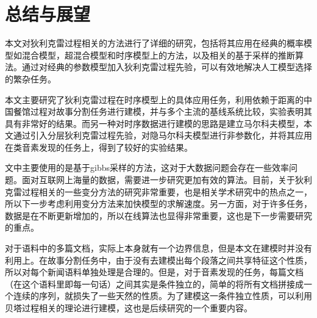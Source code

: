 \chapter{总结与展望}
本文对狄利克雷过程相关的方法进行了详细的研究，包括将其应用在经典的概率模型如混合模型，超混合模型和时序模型上的方法，以及相关的基于采样的推断算法。通过对经典的参数模型加入狄利克雷过程先验，可以有效地解决人工模型选择的繁杂任务。

本文主要研究了狄利克雷过程在时序模型上的具体应用任务，利用依赖于距离的中国餐馆过程对故事分割任务进行建模，并与多个主流的基线系统比较，实验表明其具有非常好的结果。而另一种对时序数据进行建模的思路是建立马尔科夫模型，本文通过引入分层狄利克雷过程先验，对隐马尔科夫模型进行非参数化，并将其应用在类音素发现的任务上，得到了较好的实验结果。

文中主要使用的是基于gibbs采样的方法，这对于大数据问题会存在一些效率问题。面对互联网上海量的数据，需要进一步研究更加有效的算法。目前，关于狄利克雷过程相关的一些变分方法的研究非常重要，也是相关学术研究中的热点之一，所以下一步考虑利用变分方法来加快模型的求解速度。另一方面，对于许多任务，数据是在不断更新增加的，所以在线算法也显得非常重要，这也是下一步需要研究的重点。

对于语料中的多篇文档，实际上本身就有一个边界信息，但是本文在建模时并没有利用上。在故事分割任务中，由于没有去建模出每个段落之间共享特征这个性质，所以对每个新闻语料单独处理是合理的。但是，对于音素发现的任务，每篇文档（在这个语料里即每一句话）之间其实是条件独立的，简单的将所有文档拼接成一个连续的序列，就损失了一些天然的性质。为了建模这一条件独立性质，可以利用贝塔过程\cite{fox2009sharing}相关的理论进行建模，这也是后续研究的一个重要内容。